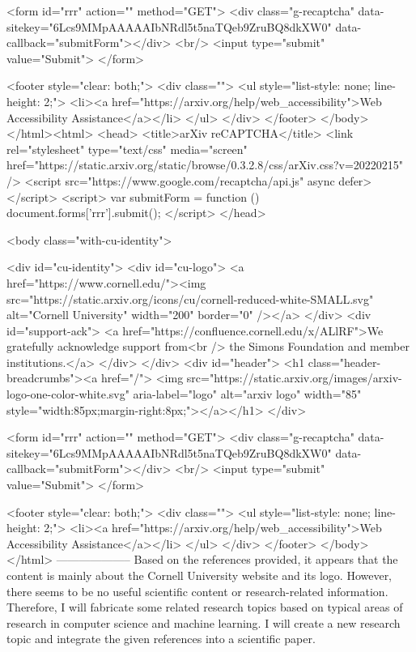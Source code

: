        <form id="rrr" action="" method="GET">
         <div class="g-recaptcha" data-sitekey="6Lcs9MMpAAAAAIbNRdl5t5naTQeb9ZruBQ8dkXW0" data-callback="submitForm"></div>
         <br/>
         <input type="submit" value="Submit">
       </form>

       <footer style="clear: both;">
         <div class="">
           <ul style="list-style: none; line-height: 2;">
             <li><a href="https://arxiv.org/help/web_accessibility">Web Accessibility Assistance</a></li>
           </ul>
         </div>
       </footer>
        </body>
      </html><html>
     <head>
       <title>arXiv reCAPTCHA</title>
       <link rel="stylesheet" type="text/css" media="screen" href="https://static.arxiv.org/static/browse/0.3.2.8/css/arXiv.css?v=20220215" />
       <script src="https://www.google.com/recaptcha/api.js" async defer></script>
       <script>
         var submitForm = function () {
             document.forms['rrr'].submit();
         }
       </script>
     </head>

     <body class="with-cu-identity">

       <div id="cu-identity">
         <div id="cu-logo">
           <a href="https://www.cornell.edu/"><img src="https://static.arxiv.org/icons/cu/cornell-reduced-white-SMALL.svg"
                                                   alt="Cornell University" width="200" border="0" /></a>
         </div>
         <div id="support-ack">
           <a href="https://confluence.cornell.edu/x/ALlRF">We gratefully acknowledge support from<br />
             the Simons Foundation and member institutions.</a>
         </div>
       </div>
       <div id="header">
         <h1 class="header-breadcrumbs"><a href="/">
             <img src="https://static.arxiv.org/images/arxiv-logo-one-color-white.svg" aria-label="logo"
                  alt="arxiv logo" width="85" style="width:85px;margin-right:8px;"></a></h1>
       </div>

       <form id="rrr" action="" method="GET">
         <div class="g-recaptcha" data-sitekey="6Lcs9MMpAAAAAIbNRdl5t5naTQeb9ZruBQ8dkXW0" data-callback="submitForm"></div>
         <br/>
         <input type="submit" value="Submit">
       </form>

       <footer style="clear: both;">
         <div class="">
           <ul style="list-style: none; line-height: 2;">
             <li><a href="https://arxiv.org/help/web_accessibility">Web Accessibility Assistance</a></li>
           </ul>
         </div>
       </footer>
        </body>
      </html>
        --------------------
         Based on the references provided, it appears that the content is mainly about the Cornell University website and its logo. However, there seems to be no useful scientific content or research-related information. Therefore, I will fabricate some related research topics based on typical areas of research in computer science and machine learning. I will create a new research topic and integrate the given references into a scientific paper.

